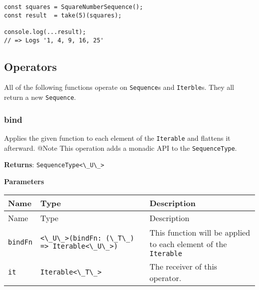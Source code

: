 \begin{lstlisting}[label=c165f899-ffa4-43ac-bf8a-3fe162f8bcb1]
const squares = SquareNumberSequence();
const result  = take(5)(squares);
                                       
console.log(...result);
// => Logs '1, 4, 9, 16, 25'
\end{lstlisting}

\hypertarget{569b08a0-06b3-45e3-b4e9-576f534c5301}{%
\subsection{Operators}\label{sub:appendix_operators} }

All of the following functions operate on
\passthrough{\lstinline!Sequence!}s and
\passthrough{\lstinline!Iterble!}s. They all return a new
\passthrough{\lstinline!Sequence!}.

\hypertarget{ac6d2b03-9c43-4e0e-8308-92102a526003}{%
\subsubsection{bind}\label{ac6d2b03-9c43-4e0e-8308-92102a526003}}

Applies the given function to each element of the
\passthrough{\lstinline!Iterable!} and flattens it afterward. @Note This
operation adds a monadic API to the
\passthrough{\lstinline!SequenceType!}.

\textbf{Returns}: \passthrough{\lstinline!SequenceType<\_U\_>!}

\textbf{Parameters}

\begin{longtable}[]{
  >{\raggedright\arraybackslash}p{}
  >{\raggedright\arraybackslash}p{}
  >{\raggedright\arraybackslash}p{}@{}}

\toprule\noalign{}
Name & Type & Description \\
\midrule\noalign{}
\endfirsthead
\toprule\noalign{}
Name & Type & Description \\
\midrule\noalign{}
\endhead
\bottomrule\noalign{}
\endlastfoot
\passthrough{\lstinline!bindFn!} &
\passthrough{\lstinline!<\_U\_>(bindFn: (\_T\_) => Iterable<\_U\_>)!} &
This function will be applied to each element of the
\passthrough{\lstinline!Iterable!} \\
\passthrough{\lstinline!it!} & \passthrough{\lstinline!Iterable<\_T\_>!}
& The receiver of this operator. \\
\end{longtable}

